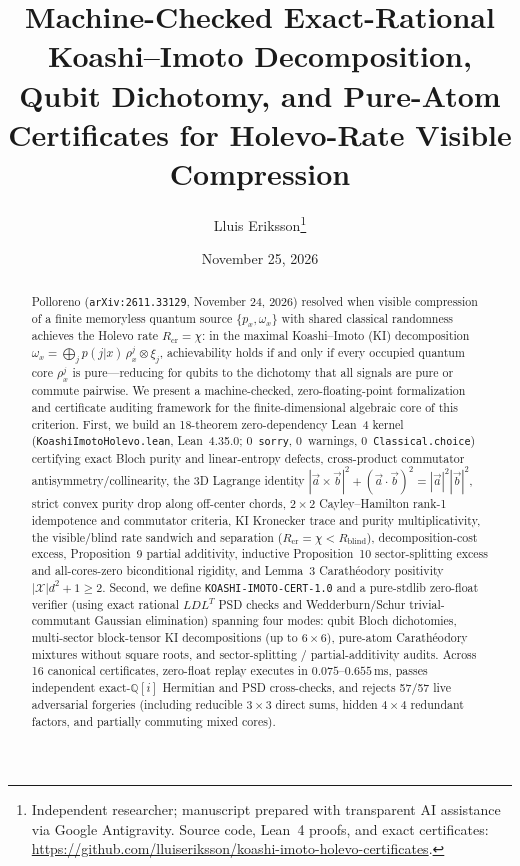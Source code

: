 \documentclass[11pt,twocolumn]{article}
\title{\textbf{Machine-Checked Exact-Rational Koashi--Imoto Decomposition, Qubit Dichotomy, and Pure-Atom Certificates for Holevo-Rate Visible Compression}}
\author{Lluis Eriksson\thanks{Independent researcher; manuscript prepared with transparent AI assistance via Google Antigravity. Source code, Lean~4 proofs, and exact certificates: \url{https://github.com/lluiseriksson/koashi-imoto-holevo-certificates}.}}
\date{November 25, 2026}
\newcommand{\QQ}{\mathbb{Q}}
\begin{document}
\maketitle

\begin{abstract}
Polloreno (\texttt{arXiv:2611.33129}, November 24, 2026) resolved when visible compression of a finite memoryless quantum source $\{p_x, \omega_x\}$ with shared classical randomness achieves the Holevo rate $R_{\mathrm{cr}} = \chi$: in the maximal Koashi--Imoto (KI) decomposition $\omega_x = \bigoplus_j p(j|x)\,\rho_x^j \otimes \xi_j$, achievability holds if and only if every occupied quantum core $\rho_x^j$ is pure—reducing for qubits to the dichotomy that all signals are pure or commute pairwise. We present a machine-checked, zero-floating-point formalization and certificate auditing framework for the finite-dimensional algebraic core of this criterion. First, we build an 18-theorem zero-dependency Lean~4 kernel (\texttt{KoashiImotoHolevo.lean}, Lean~4.35.0; 0~\texttt{sorry}, 0~warnings, 0~\texttt{Classical.choice}) certifying exact Bloch purity and linear-entropy defects, cross-product commutator antisymmetry/collinearity, the 3D Lagrange identity $|\vec{a}\times\vec{b}|^2 + (\vec{a}\cdot\vec{b})^2 = |\vec{a}|^2|\vec{b}|^2$, strict convex purity drop along off-center chords, $2\times 2$ Cayley--Hamilton rank-1 idempotence and commutator criteria, KI Kronecker trace and purity multiplicativity, the visible/blind rate sandwich and separation ($R_{\mathrm{cr}} = \chi < R_{\mathrm{blind}}$), decomposition-cost excess, Proposition~9 partial additivity, inductive Proposition~10 sector-splitting excess and all-cores-zero biconditional rigidity, and Lemma~3 Carath\'eodory positivity $|\mathcal{X}|d^2 + 1 \ge 2$. Second, we define \texttt{KOASHI-IMOTO-CERT-1.0} and a pure-stdlib zero-float verifier (using exact rational $LDL^T$ PSD checks and Wedderburn/Schur trivial-commutant Gaussian elimination) spanning four modes: qubit Bloch dichotomies, multi-sector block-tensor KI decompositions (up to $6\times 6$), pure-atom Carath\'eodory mixtures without square roots, and sector-splitting / partial-additivity audits. Across 16 canonical certificates, zero-float replay executes in $0.075$--$0.655\,\mathrm{ms}$, passes independent exact-$\QQ[i]$ Hermitian and PSD cross-checks, and rejects 57/57 live adversarial forgeries (including reducible $3\times 3$ direct sums, hidden $4\times 4$ redundant factors, and partially commuting mixed cores).
\end{abstract}
\end{document}
